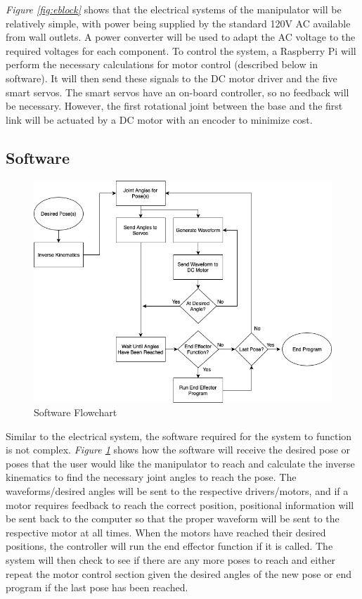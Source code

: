 \documentclass[12pt]{report}
\begin{document}
\emph{Figure \ref{fig:eblock}} shows that the electrical systems of the manipulator will be relatively simple, with power being supplied by the standard 120V AC available from wall outlets. A power converter will be used to adapt the AC voltage to the required voltages for each component. To control the system, a Raspberry Pi will perform the necessary calculations for motor control (described below in software). It will then send these signals to the DC motor driver and the five smart servos. The smart servos have an on-board controller, so no feedback will be necessary. However, the first rotational joint between the base and the first link will be actuated by a DC motor with an encoder to minimize cost.

\subsection{Software}
\begin{figure}[ht]
  \centering
  \includegraphics[width=.85\textwidth]{sblock}
  \caption{Software Flowchart}
  \label{fig:sblock}
\end{figure}

Similar to the electrical system, the software required for the system to function is not complex. \emph{Figure \ref{fig:sblock}} shows how the software will receive the desired pose or poses that the user would like the manipulator to reach and calculate the inverse kinematics to find the necessary joint angles to reach the pose. The waveforms/desired angles will be sent to the respective drivers/motors, and if a motor requires feedback to reach the correct position, positional information will be sent back to the computer so that the proper waveform will be sent to the respective motor at all times. When the motors have reached their desired positions, the controller will run the end effector function if it is called. The system will then check to see if there are any more poses to reach and either repeat the motor control section given the desired angles of the new pose or end program if the last pose has been reached.
\end{document}
